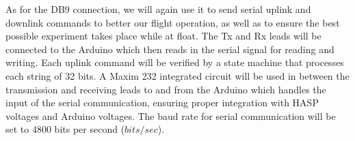 As for the DB9 connection, we will again use it to send serial uplink and downlink commands to better our flight operation, as well as to ensure the best possible experiment takes place while at float.  The Tx and Rx leads will be connected to the Arduino which then reads in the serial signal for reading and writing.  Each uplink command will be verified by a state machine that processes each string of \num{32} bits.  A Maxim 232 integrated circuit will be used in between the transmission and receiving leads to and from the Arduino which handles the input of the serial communication, ensuring proper integration with HASP voltages and Arduino voltages.  The baud rate for serial communication will be set to 4800 bits per second ($bits/sec$). 

